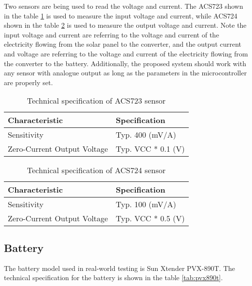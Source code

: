 \documentclass[../thesis.tex]{subfiles}
\begin{document}
Two sensors are being used to read the voltage and current. The ACS723 shown in the table \ref{tab:acs723} is used to measure the input voltage and current, while ACS724 shown in the table \ref{tab:acs724} is used to measure the output voltage and current. Note the input voltage and current are referring to the voltage and current of the electricity flowing from the solar panel to the converter, and the output current and voltage are referring to the voltage and current of the electricity flowing from the converter to the battery. Additionally, the proposed system should work with any sensor with analogue output as long as the parameters in the microcontroller are properly set.

\begin{table}[h!]
\begin{center}
\caption{Technical specification of ACS723 sensor}
\label{tab:acs723}
\begin{tabular}{l|l}
\toprule
\textbf{Characteristic} & \textbf{Specification}\\
\midrule
Sensitivity & Typ. 400 (mV/A)\\
Zero-Current Output Voltage & Typ. VCC * 0.1 (V)\\
\bottomrule
\end{tabular}
\end{center}
\end{table}

\begin{table}[h!]
\begin{center}
\caption{Technical specification of ACS724 sensor}
\label{tab:acs724}
\begin{tabular}{l|l}
\toprule
\textbf{Characteristic} & \textbf{Specification}\\
\midrule
Sensitivity & Typ. 100 (mV/A)\\
Zero-Current Output Voltage & Typ. VCC * 0.5 (V)\\
\bottomrule
\end{tabular}
\end{center}
\end{table}

\newpage
\subsection{Battery}

The battery model used in real-world testing is Sun Xtender PVX-890T. The technical specification for the battery is shown in the table \ref{tab:pvx890t}.
\end{document}
